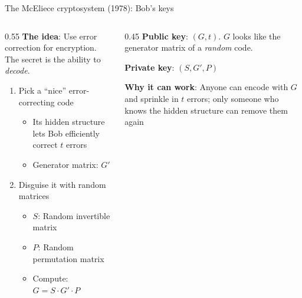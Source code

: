 \ifdefined\PRESENTATION\else\PassOptionsToClass{handout}{beamer}\fi\documentclass[aspectratio=169, lualatex]{beamer}
\begin{document}
\begin{frame}{The McEliece cryptosystem (1978): Bob's keys}
	\begin{columns}[c]
		\begin{column}{0.55\textwidth}
			\textbf{The idea}: Use error correction for encryption. The secret is the ability to \textit{decode}.
			\begin{enumerate}
				\item Pick a ``nice'' error-correcting code
				      \begin{itemize}
					      \item Its hidden structure lets Bob efficiently correct $t$ errors
					      \item Generator matrix: $G'$
				      \end{itemize}
				\item Disguise it with random matrices
				      \begin{itemize}
					      \item $S$: Random invertible matrix
					      \item $P$: Random permutation matrix
					      \item Compute: $G = S \cdot G' \cdot P$
				      \end{itemize}
			\end{enumerate}
		\end{column}
		\begin{column}{0.45\textwidth}
			\textbf{Public key}: $(G, t)$. $G$ looks like the generator matrix of a \textit{random} code.

			\vspace{2mm}
			\textbf{Private key}: $(S, G', P)$

			\vspace{4mm}
			\textbf{Why it can work}: Anyone can encode with $G$ and sprinkle in $t$ errors; only someone who knows the hidden structure can remove them again
		\end{column}
	\end{columns}
\end{frame}
\end{document}
